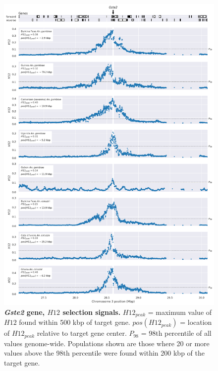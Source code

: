\documentclass[a4paper,11pt,abstracton,hidelinks]{scrartcl}
\begin{document}
\begin{figure}[t!]
	\begin{center}
		\includegraphics*[width=1\linewidth,center]{artwork/locus_gste2_h12_pdist.png}
	\end{center}
	\caption[\textit{Gste2} gene, $H12$ selection signals]{
	\textbf{\textit{Gste2} gene, $H12$ selection signals.}
	$H12_{peak}$ = maximum value of $H12$ found within 500 kbp of target gene. 
	$pos(H12_{peak})$ = location of $H12_{peak}$ relative to target gene center.
	$P_{98}$ = 98th percentile of all values genome-wide.
	Populations shown are those where 20 or more values above the 98th percentile were found within 200 kbp of the target gene.
	} 
	\label{fig:locus_gste2_h12}
\end{figure}


\clearpage
\end{document}
